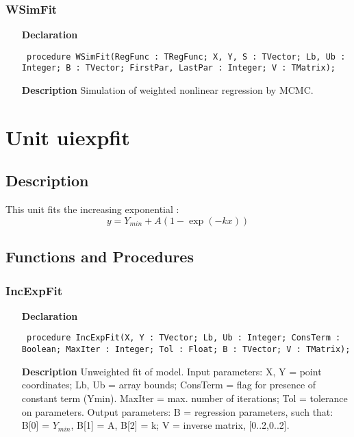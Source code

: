 \documentclass[12pt,a4paper,oneside]{report}
\newcommand{\declarationitem}[1]{\textbf{#1}}
\newcommand{\descriptiontitle}[1]{\textbf{#1}}
\newcommand{\code}[1]{\texttt{#1}}
\begin{document}
\subsubsection{WSimFit}
\label{unlfit-WSimFit}
\begin{itemize}\item[\declarationitem{Declaration}\hfill]
	\begin{flushleft}
		\code{
			procedure WSimFit(RegFunc : TRegFunc; X, Y, S : TVector; Lb, Ub : Integer; B : TVector; FirstPar, LastPar : Integer; V : TMatrix);}
		
	\end{flushleft}
	
	\par
	\item[\descriptiontitle{Description}]
	Simulation of weighted nonlinear regression by MCMC.
	
\end{itemize}
\section{Unit uiexpfit}
\label{uiexpfit}
\subsection{Description}
This unit fits the increasing exponential :
$$y = Y_{min} + A(1-\exp(-kx))$$
\subsection{Functions and Procedures}
\subsubsection{IncExpFit}
\label{uiexpfit-IncExpFit}
\begin{itemize}\item[\declarationitem{Declaration}\hfill]
	\begin{flushleft}
		\code{
			procedure IncExpFit(X, Y : TVector; Lb, Ub : Integer; ConsTerm : Boolean; MaxIter : Integer; Tol : Float; B : TVector; V : TMatrix);}
		
	\end{flushleft}
	
	\par
	\item[\descriptiontitle{Description}]
	Unweighted fit of model. Input parameters: X, Y = point coordinates; Lb, Ub = array bounds; ConsTerm = flag for presence of constant term (Ymin). MaxIter = max. number of iterations; Tol = tolerance on parameters. Output parameters: B = regression parameters, such that:	
	B[0] = $Y_{min}$, B[1] = A, B[2] = k; V = inverse matrix, [0..2,0..2].
	
\end{itemize}
\end{document}
